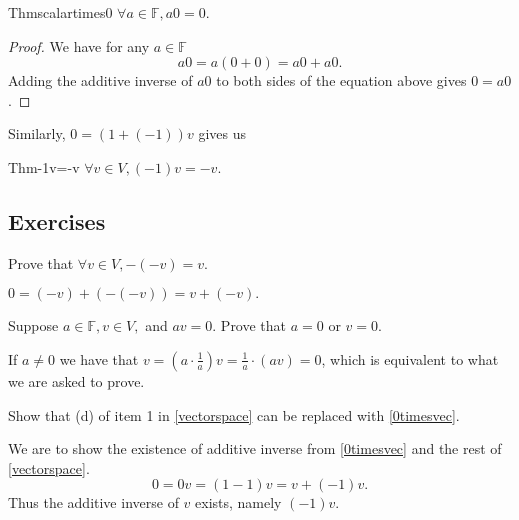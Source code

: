 \begin{reference}{Thm}{scalartimes0}
  $\forall a\in \mathbb F, a0=0.$
\end{reference}

\begin{proof}
  We have for any $a\in \mathbb F$
  \[
    a0=a(0+0)=a0+a0.
  \]
  Adding the additive inverse of $a0$ to both sides of the equation above gives $0=a0$.
\end{proof}

Similarly, $0=(1+(-1))v$ gives us

\begin{reference}{Thm}{-1v=-v}
  $\forall v\in V, (-1)v=-v.$
\end{reference}

\subsection*{Exercises}

\begin{exercise}
  Prove that $\forall v\in V, -(-v)=v.$
\end{exercise}

$0=(-v)+(-(-v))=v+(-v).$

\begin{exercise}
  Suppose $a\in \mathbb F,v\in V,$ and $av=0.$ Prove that $a=0$ or $v=0$.
\end{exercise}

If $a\neq0$ we have that $\displaystyle v=(a\cdot \frac{1}{a})v=\frac{1}{a}\cdot(av)=0$, which is equivalent to what we are asked to prove.

\setcounter{exercise}{4}

\begin{exercise}
  Show that (d) of item 1 in \ref{vectorspace} can be replaced with \ref{0timesvec}.
\end{exercise}

We are to show the existence of additive inverse from \ref{0timesvec} and the rest of \ref{vectorspace}.
\[
  0=0v=(1-1)v=v+(-1)v.
\]
Thus the additive inverse of $v$ exists, namely $(-1)v$.

